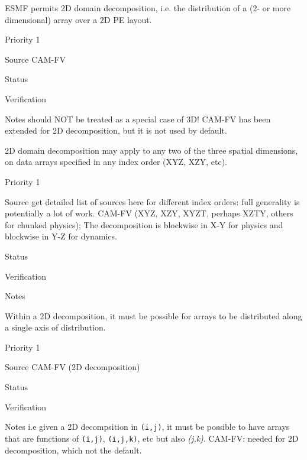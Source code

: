 
ESMF permits 2D domain decomposition, i.e. the distribution of a
(2- or more dimensional) array over a 2D PE layout.

\begin{reqlist}
\item[Priority] 1
\item[Source] CAM-FV
\item[Status]
\item[Verification]
\item[Notes] should NOT be treated as a special case of 3D!
	CAM-FV has been extended for 2D decomposition, but 
	it is not used by default.
\end{reqlist}


2D domain decomposition may apply to any two of the three spatial
dimensions, on data arrays specified in any index order (XYZ, XZY,
etc).

\begin{reqlist}
\item[Priority] 1
\item[Source] get detailed list of sources here for different index
  orders: full generality is potentially a lot of work.
  CAM-FV  (XYZ, XZY, XYZT, perhaps XZTY, others for chunked physics);
  The decomposition is blockwise in X-Y for physics and blockwise in 
  Y-Z for dynamics.
\item[Status]
\item[Verification]
\item[Notes]
\end{reqlist}


Within a 2D decomposition, it must be possible for arrays to be
distributed along a single axis of distribution.

\begin{reqlist}
\item[Priority] 1
\item[Source] CAM-FV (2D decomposition)
\item[Status]
\item[Verification]
\item[Notes] i.e given a 2D decompsition in \texttt{(i,j)}, it must be
  possible to have arrays that are functions of \texttt{(i,j)},
  \texttt{(i,j,k)}, etc but also \emph{(j,k)}.  CAM-FV: needed for
  2D decomposition, which not the default.
\end{reqlist}

